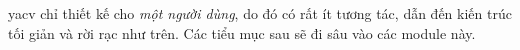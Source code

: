 \documentclass[../../thesis]{subfiles}
\begin{document}
yacv chỉ thiết kế cho \emph{một người dùng}, do đó có rất ít tương tác, dẫn đến
kiến trúc tối giản và rời rạc như trên. Các tiểu mục sau sẽ đi sâu vào các
module này.
















\end{document}
